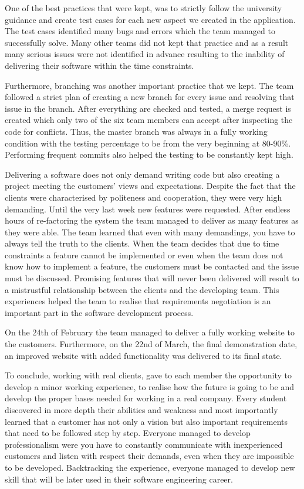 \documentclass{l3proj}
\begin{document}
One of the best practices that were kept, was to strictly follow the university guidance and create test cases for each new aspect we created in the application. The test cases identified many bugs and errors which the team managed to successfully solve. Many other teams did not kept that practice and as a result many serious issues were not identified in advance resulting to the inability of delivering their software within the time constraints.

Furthermore, branching was another important practice that we kept. The team followed a strict plan of creating a new branch for every issue and resolving that issue in the branch. After everything are checked and tested, a merge request is created which only two of the six team members can accept after inspecting the code for conflicts. Thus, the master branch was always in a fully working condition with the testing percentage to be from the very beginning at 80-90\%. Performing frequent commits also helped the testing to be constantly kept high.

Delivering a software does not only demand writing code but also creating a project meeting the customers' views and expectations. Despite the fact that the clients were characterised by politeness and cooperation, they were very high demanding. Until the very last week new features were requested. After endless hours of re-factoring the system the team managed to deliver as many features as they were able. The team learned that even with many demandings, you have to always tell the truth to the clients. When the team decides that due to time constraints a feature cannot be implemented or even when the team does not know how to implement a feature, the customers must be contacted and the issue must be discussed. Promising features that will never been delivered will result to a mistrustful relationship between the clients and the developing team. This experiences helped the team to realise that requirements negotiation is an important part in the software development process.

On the 24th of February the team managed to deliver a fully working website to the customers. Furthermore, on the 22nd of March, the final demonstration date, an improved website with added functionality was delivered to its final state.

To conclude, working with real clients, gave to each member the opportunity to develop a minor working experience, to realise how the future is going to be and develop the proper bases needed for working in a real company. Every student discovered in more depth their abilities and weakness and most importantly learned that a customer has not only a vision but also important requirements that need to be followed step by step. Everyone managed to develop professionalism were you have to constantly communicate with inexperienced customers and listen with respect their demands, even when they are impossible to be developed. Backtracking the experience, everyone managed to develop new skill that will be later used in their software engineering career.
\end{document}
